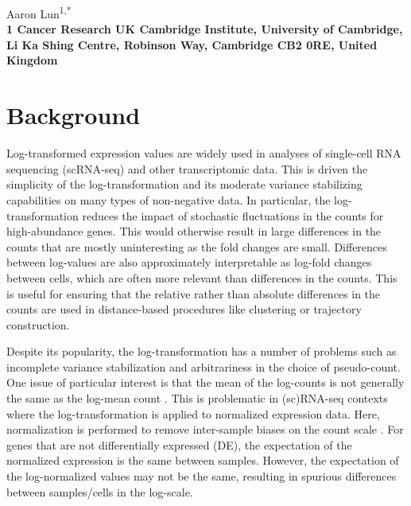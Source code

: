 \documentclass[10pt,letterpaper]{article}
\begin{document}
\vspace*{0.35in}

\begin{flushleft}
{\Large
    \textbf{}
}
\newline

Aaron Lun\textsuperscript{1,*}
\\
\bigskip
\bf{1} Cancer Research UK Cambridge Institute, University of Cambridge, Li Ka Shing Centre, Robinson Way, Cambridge CB2 0RE, United Kingdom \\
\bigskip

\end{flushleft}

\section{Background}
Log-transformed expression values are widely used in analyses of single-cell RNA sequencing (scRNA-seq) and other transcriptomic data.
This is driven the simplicity of the log-transformation and its moderate variance stabilizing capabilities on many types of non-negative data.
In particular, the log-transformation reduces the impact of stochastic fluctuations in the counts for high-abundance genes.
This would otherwise result in large differences in the counts that are mostly uninteresting as the fold changes are small.
Differences between log-values are also approximately interpretable as log-fold changes between cells, which are often more relevant than differences in the counts.
This is useful for ensuring that the relative rather than absolute differences in the counts are used in distance-based procedures like clustering or trajectory construction.

Despite its popularity, the log-transformation has a number of problems such as incomplete variance stabilization and arbitrariness in the choice of pseudo-count.
One issue of particular interest is that the mean of the log-counts is not generally the same as the log-mean count \cite{hicks2017missing}.
This is problematic in (sc)RNA-seq contexts where the log-transformation is applied to normalized expression data.
Here, normalization is performed to remove inter-sample biases on the count scale \cite{robinson2010scaling,lun2016pooling}.
For genes that are not differentially expressed (DE), the expectation of the normalized expression is the same between samples.
However, the expectation of the log-normalized values may not be the same, resulting in spurious differences between samples/cells in the log-scale.
\end{document}
